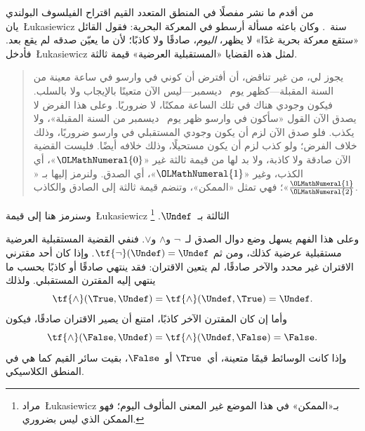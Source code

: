 \documentclass[../../../include/open-logic-section]{subfiles}
\begin{document}


من أقدم ما نشر مفصلًا في المنطق المتعدد القيم اقتراح الفيلسوف
البولندي يان~\L ukasiewicz سنة~. وكان باعثه مسألة أرسطو في
المعركة البحرية: فقول القائل «ستقع معركة بحرية غدًا» لا يظهر،
\emph{اليوم}، صادقًا ولا كاذبًا؛ لأن ما يعيّن صدقه لم يقع بعد.
فأدخل~\L ukasiewicz لمثل هذه القضايا «المستقبلية العرضية» قيمة ثالثة.
\begin{quote}
يجوز لي، من غير تناقض، أن أفترض أن كوني في وارسو في ساعة معينة من
السنة المقبلة---كظهر يوم~ ديسمبر---ليس الآن متعينًا بالإيجاب ولا
بالسلب. فيكون وجودي هناك في تلك الساعة ممكنًا، لا ضروريًا. وعلى هذا
الفرض لا يصدق الآن القول «سأكون في وارسو ظهر يوم~ ديسمبر من السنة
المقبلة»، ولا يكذب. فلو صدق الآن لزم أن يكون وجودي المستقبلي في وارسو
ضروريًا، وذلك خلاف الفرض؛ ولو كذب لزم أن يكون مستحيلًا، وذلك خلافه
أيضًا. فليست القضية الآن صادقة ولا كاذبة، ولا بد لها من قيمة ثالثة
غير «${\OLMathNumeral{0}}$»، أي الكذب، وغير «${\OLMathNumeral{1}}$»، أي الصدق. ولنرمز إليها بـ
«$\frac{{\OLMathNumeral{1}}}{{\OLMathNumeral{2}}}$»؛ فهي تمثل «الممكن»، وتنضم قيمة ثالثة إلى الصادق
والكاذب.
\end{quote}
وسنرمز هنا إلى قيمة~\L ukasiewicz الثالثة بـ~$\Undef$.
\footnote{مراد~\L ukasiewicz بـ«الممكن» في هذا الموضع غير المعنى
المألوف اليوم؛ فهو الممكن الذي ليس بضروري.}

وعلى هذا الفهم يسهل وضع دوال الصدق لـ~$\lnot$ و$\land$ و$\lor$.
فنفي القضية المستقبلية العرضية مستقبلية عرضية كذلك، ومن ثم
$\tf{\lnot}(\Undef) = \Undef$. وإذا كان أحد مقترني الاقتران غير
محدد والآخر صادقًا، لم يتعين الاقتران: فقد ينتهي صادقًا أو كاذبًا
بحسب ما ينتهي إليه المقترن المستقبلي. ولذلك
\[
    \tf{\land}(\True, \Undef) =
\tf{\land}(\Undef, \True) =
\Undef.
\]
وأما إن كان المقترن الآخر كاذبًا، امتنع أن يصير الاقتران صادقًا،
فيكون
\[\tf{\land}(\False, \Undef) =
\tf{\land}(\Undef, \False) = \False.\]
وإذا كانت الوسائط قيمًا متعينة، أي~$\True$ أو~$\False$، بقيت سائر
القيم كما هي في المنطق الكلاسيكي.
\end{document}
